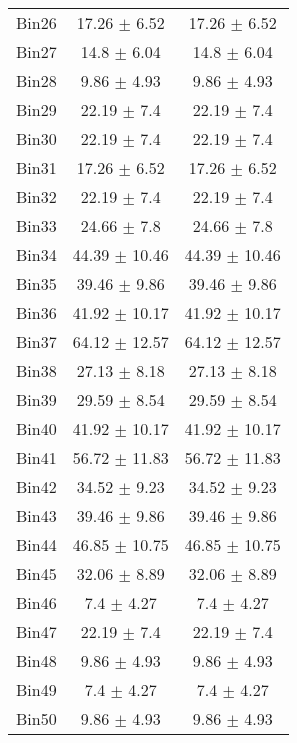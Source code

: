 \begin{tabular}{|c|c|c|}
     Bin26 & 17.26 $\pm$ 6.52 & 17.26 $\pm$ 6.52 \\ \cline{1-3} 
     Bin27 & 14.8 $\pm$ 6.04 & 14.8 $\pm$ 6.04 \\ \cline{1-3} 
     Bin28 & 9.86 $\pm$ 4.93 & 9.86 $\pm$ 4.93 \\ \cline{1-3} 
     Bin29 & 22.19 $\pm$ 7.4 & 22.19 $\pm$ 7.4 \\ \cline{1-3} 
     Bin30 & 22.19 $\pm$ 7.4 & 22.19 $\pm$ 7.4 \\ \cline{1-3} 
     Bin31 & 17.26 $\pm$ 6.52 & 17.26 $\pm$ 6.52 \\ \cline{1-3} 
     Bin32 & 22.19 $\pm$ 7.4 & 22.19 $\pm$ 7.4 \\ \cline{1-3} 
     Bin33 & 24.66 $\pm$ 7.8 & 24.66 $\pm$ 7.8 \\ \cline{1-3} 
     Bin34 & 44.39 $\pm$ 10.46 & 44.39 $\pm$ 10.46 \\ \cline{1-3} 
     Bin35 & 39.46 $\pm$ 9.86 & 39.46 $\pm$ 9.86 \\ \cline{1-3} 
     Bin36 & 41.92 $\pm$ 10.17 & 41.92 $\pm$ 10.17 \\ \cline{1-3} 
     Bin37 & 64.12 $\pm$ 12.57 & 64.12 $\pm$ 12.57 \\ \cline{1-3} 
     Bin38 & 27.13 $\pm$ 8.18 & 27.13 $\pm$ 8.18 \\ \cline{1-3} 
     Bin39 & 29.59 $\pm$ 8.54 & 29.59 $\pm$ 8.54 \\ \cline{1-3} 
     Bin40 & 41.92 $\pm$ 10.17 & 41.92 $\pm$ 10.17 \\ \cline{1-3} 
     Bin41 & 56.72 $\pm$ 11.83 & 56.72 $\pm$ 11.83 \\ \cline{1-3} 
     Bin42 & 34.52 $\pm$ 9.23 & 34.52 $\pm$ 9.23 \\ \cline{1-3} 
     Bin43 & 39.46 $\pm$ 9.86 & 39.46 $\pm$ 9.86 \\ \cline{1-3} 
     Bin44 & 46.85 $\pm$ 10.75 & 46.85 $\pm$ 10.75 \\ \cline{1-3} 
     Bin45 & 32.06 $\pm$ 8.89 & 32.06 $\pm$ 8.89 \\ \cline{1-3} 
     Bin46 & 7.4 $\pm$ 4.27 & 7.4 $\pm$ 4.27 \\ \cline{1-3} 
     Bin47 & 22.19 $\pm$ 7.4 & 22.19 $\pm$ 7.4 \\ \cline{1-3} 
     Bin48 & 9.86 $\pm$ 4.93 & 9.86 $\pm$ 4.93 \\ \cline{1-3} 
     Bin49 & 7.4 $\pm$ 4.27 & 7.4 $\pm$ 4.27 \\ \cline{1-3} 
     Bin50 & 9.86 $\pm$ 4.93 & 9.86 $\pm$ 4.93 \\ \cline{1-3} 

\end{tabular}
